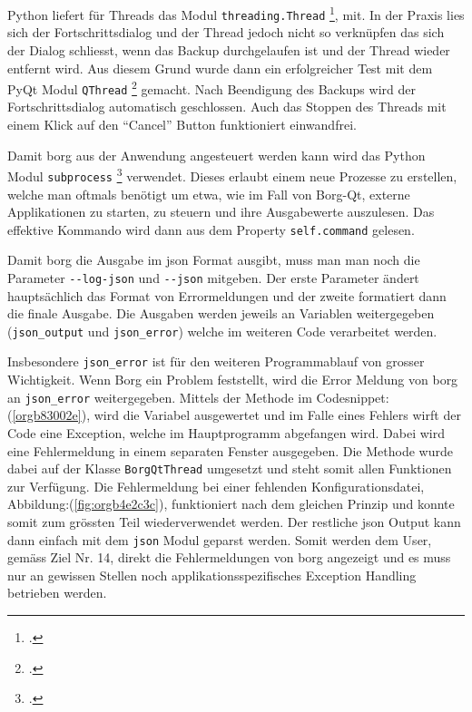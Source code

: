 Python liefert für Threads das Modul \texttt{threading.Thread} \footcite{threading},
mit. In der Praxis lies sich der Fortschrittsdialog und der Thread jedoch nicht
so verknüpfen das sich der Dialog schliesst, wenn das Backup durchgelaufen
ist und der Thread wieder entfernt wird. Aus diesem Grund wurde dann ein
erfolgreicher Test mit dem PyQt Modul \texttt{QThread} \footcite{qthread} gemacht. Nach
Beendigung des Backups wird der Fortschrittsdialog automatisch geschlossen.
Auch das Stoppen des Threads mit einem Klick auf den "`Cancel"' Button
funktioniert einwandfrei.

Damit \gls{borg} aus der Anwendung angesteuert werden kann wird das Python Modul
\texttt{subprocess} \footcite{subprocess} verwendet. Dieses erlaubt einem neue Prozesse
zu erstellen, welche man oftmals benötigt um etwa, wie im Fall von Borg-Qt,
externe Applikationen zu starten, zu steuern und ihre Ausgabewerte auszulesen.
Das effektive Kommando wird dann aus dem Property \texttt{self.command} gelesen.

Damit \gls{borg} die Ausgabe im \gls{json} Format ausgibt, muss man man noch die
Parameter \texttt{-{}-log-json} und \texttt{-{}-json} mitgeben. Der erste Parameter ändert
hauptsächlich das Format von Errormeldungen und der zweite formatiert dann die
finale Ausgabe. Die Ausgaben werden jeweils an Variablen weitergegeben
(\texttt{json\_output} und \texttt{json\_error}) welche im weiteren Code verarbeitet werden.

Insbesondere \texttt{json\_error} ist für den weiteren Programmablauf von grosser
Wichtigkeit. Wenn Borg ein Problem feststellt, wird die Error Meldung von
\gls{borg} an \texttt{json\_error} weitergegeben. Mittels der Methode im
Codesnippet:(\ref{orgb83002e}), wird die Variabel ausgewertet und im Falle eines
Fehlers wirft der Code eine Exception, welche im Hauptprogramm abgefangen wird.
Dabei wird eine Fehlermeldung in einem separaten Fenster ausgegeben. Die
Methode wurde dabei auf der Klasse \texttt{BorgQtThread} umgesetzt und steht somit
allen Funktionen zur Verfügung. Die Fehlermeldung bei einer fehlenden
Konfigurationsdatei, Abbildung:(\ref{fig:orgb4e2c3c}), funktioniert nach
dem gleichen Prinzip und konnte somit zum grössten Teil wiederverwendet werden.
Der restliche \gls{json} Output kann dann einfach mit dem \texttt{json} Modul geparst
werden. Somit werden dem User, gemäss Ziel Nr. 14, direkt die Fehlermeldungen
von \gls{borg} angezeigt und es muss nur an gewissen Stellen noch
applikationsspezifisches Exception Handling betrieben werden.

